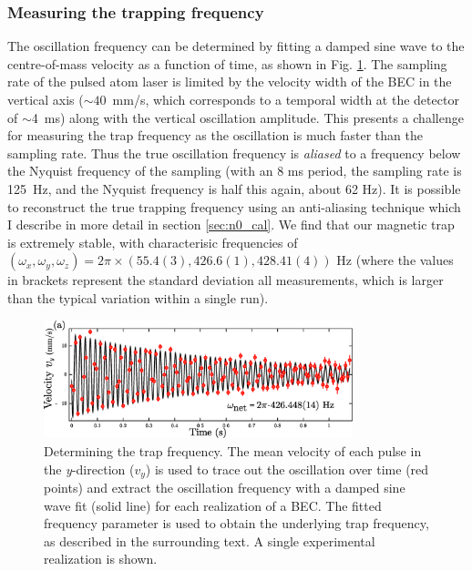 \subsubsection{Measuring the trapping frequency}
	\label{sec:trap_freq_meas}

	The oscillation frequency can be determined by fitting a damped sine wave to the centre-of-mass velocity as a function of time, as shown in Fig. \ref{fig:trap_freq_eg}.
	The sampling rate of the pulsed atom laser is limited by the velocity width of the BEC in the vertical axis (\(\sim40\)~mm/s, which corresponds to a temporal width at the detector of \(\sim\)4~ms) along with the vertical oscillation amplitude. This presents a challenge for measuring the trap frequency as the oscillation is much faster than the sampling rate. 
	Thus the true oscillation frequency is \emph{aliased} to a frequency below the Nyquist frequency of the sampling (with an 8 ms period, the sampling rate is 125~Hz, and the Nyquist frequency is half this again, about 62 Hz).
	It is possible to reconstruct the true trapping frequency using an anti-aliasing technique which I describe in more detail in section \ref{sec:n0_cal}.
	We find that our magnetic trap is extremely stable, with characterisic frequencies of $(\omega_x,\omega_y,\omega_z)= 2\pi\times(55.4(3),426.6(1),428.41(4))$ Hz (where the values in brackets represent the standard deviation all measurements, which is larger than the typical variation within a single run).
	\begin{figure}
	\centering
		\includegraphics[width=0.8\textwidth]{fig/tuneout/trap_freq_eg}
			\caption{ Determining the trap frequency. The mean velocity of each pulse in the \textit{y}-direction ($v_y$) is used to trace out the oscillation over time (red points) and extract the oscillation frequency with a damped sine wave fit (solid line) for each realization of a BEC. The fitted frequency parameter is used to obtain the underlying trap frequency, as described in the surrounding text. A single experimental realization is shown.}
			\label{fig:trap_freq_eg}
	\end{figure}	
	
